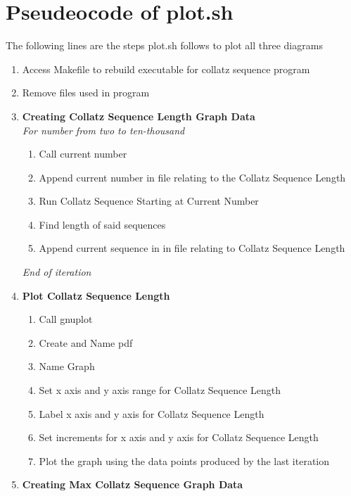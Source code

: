 \documentclass[11pt]{article} %
\begin{document}
\section{Pseudeocode of plot.sh }
\begin{flushleft}
The following lines are the steps plot.sh follows to plot all three diagrams
\begin{enumerate}
\item Access Makefile to rebuild executable for collatz sequence program
\item Remove files used in program

\item \small {\textbf{Creating Collatz Sequence Length Graph Data}}
\\
\emph{For number from two to ten-thousand}
\begin{enumerate}
\item Call current number 
\item Append current number in file relating to the Collatz Sequence Length
\item Run Collatz Sequence Starting at Current Number
\item Find length of said sequences
\item Append current sequence in in file relating to Collatz Sequence Length
\end{enumerate}
\emph{End of iteration}
\item \small {\textbf{Plot Collatz Sequence Length}}
\begin{enumerate}
\item Call gnuplot
\item Create and Name pdf
\item Name Graph
\item Set x axis and y axis range for Collatz Sequence Length
\item Label x axis and y axis for Collatz Sequence Length
\item Set increments for x axis and y axis for Collatz Sequence Length
\item Plot the graph using the data points produced by the last iteration
\end{enumerate}
\item \small \textbf{Creating Max Collatz Sequence Graph Data}  


\end{enumerate}
\end{flushleft}
\end{document}
